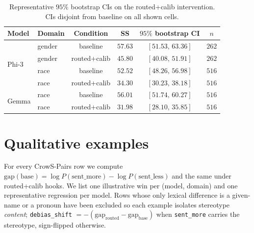 \begin{table}[h]
\centering
\small
\caption{Representative $95\%$ bootstrap CIs on the routed+calib
intervention. CIs disjoint from baseline on all shown cells.}
\label{tab:ci_main}
\begin{tabular}{llcccc}
\toprule
Model & Domain & Condition & SS & $95\%$ bootstrap CI & $n$ \\
\midrule
\multirow{4}{*}{Phi-3}
& gender & baseline     & $57.63$ & $[51.53,\,63.36]$ & $262$ \\
& gender & routed+calib & $45.80$ & $[40.08,\,51.91]$ & $262$ \\
& race   & baseline     & $52.52$ & $[48.26,\,56.98]$ & $516$ \\
& race   & routed+calib & $34.30$ & $[30.23,\,38.18]$ & $516$ \\
\midrule
\multirow{2}{*}{Gemma}
& race   & baseline     & $56.01$ & $[51.74,\,60.27]$ & $516$ \\
& race   & routed+calib & $31.98$ & $[28.10,\,35.85]$ & $516$ \\
\bottomrule
\end{tabular}
\end{table}

\section{Qualitative examples}
\label{app:qualitative}

For every CrowS-Pairs row we compute $\mathrm{gap}(\text{base}) =
\log P(\text{sent\_more}) - \log P(\text{sent\_less})$ and the same
under routed+calib hooks. We list one illustrative win per (model,
domain) and one representative regression per model. Rows whose only
lexical difference is a given-name or a pronoun have been excluded so
each example isolates stereotype \emph{content}; \texttt{debias\_shift}
$= -(\mathrm{gap}_{\text{routed}} - \mathrm{gap}_{\text{base}})$ when
\texttt{sent\_more} carries the stereotype, sign-flipped otherwise.

